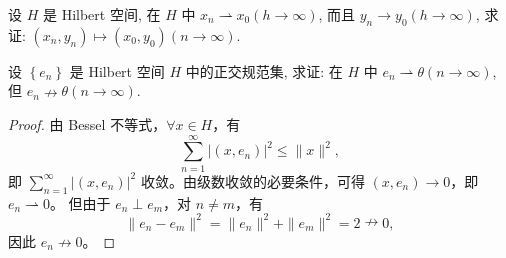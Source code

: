 \documentclass[lang=cn,newtx,10pt,scheme=chinese,thmcnt=chapter]{elegantbook}
\begin{document}
\begin{problem}
设 $H$ 是 Hilbert 空间, 在 $H$ 中 $x_n \rightharpoonup x_0(h \rightarrow \infty)$, 而且 $y_n \rightarrow y_0(h \rightarrow \infty)$, 求证: $\left(x_n, y_n\right) \mapsto\left(x_0, y_0\right)(n \rightarrow \infty)$.

\end{problem}
\begin{problem}
设 $\left\{e_n\right\}$ 是 Hilbert 空间 $H$ 中的正交规范集, 求证: 在 $H$ 中 $e_n \rightharpoonup \theta(n \rightarrow \infty)$, 但 $e_n \nrightarrow \theta(n \rightarrow \infty)$.
\end{problem}
\begin{proof}
    由 Bessel 不等式，\(\forall x \in H\)，有
\begin{equation*}
\sum_{n=1}^{\infty} \left| \left(x, e_n\right) \right|^2 \leqslant \|x\|^2,
\end{equation*}
即 \(\sum_{n=1}^{\infty} \left| \left(x, e_n\right) \right|^2\) 收敛。由级数收敛的必要条件，可得 \(\left(x, e_n\right) \to 0\)，即 \(e_n \rightharpoonup 0\)。
但由于 \(e_n \perp e_m\)，对 \(n \neq m\)，有
\begin{equation*}
\|e_n - e_m\|^2 = \|e_n\|^2 + \|e_m\|^2 = 2 \nrightarrow 0,
\end{equation*}
因此 \(e_n \nrightarrow 0\)。
\end{proof}
\end{document}
